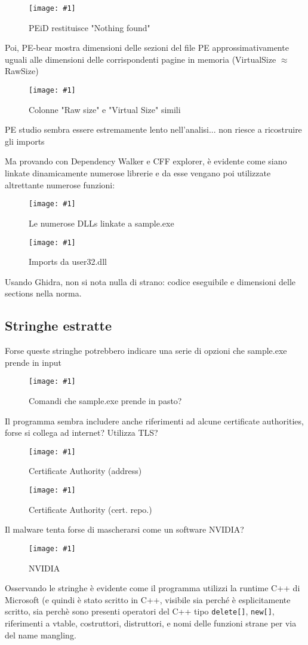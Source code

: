 \documentclass[
    a4paper, %
    11pt %
]{article}
\newcommand{\pic}[4]{\begin{figure}[H]
            \centering
            \texttt{[image: \#1]}
            \caption{#2}
            \label{fig:#1}
            \end{figure}}
\begin{document}
            \pic{nonpacker}{PEiD restituisce "Nothing found"}{14cm}{8cm}

            Poi, PE-bear mostra dimensioni delle sezioni del file PE approssimativamente uguali alle
            dimensioni delle corrispondenti pagine in memoria (VirtualSize $\approx$ RawSize)

            \pic{samesizesapprox}{Colonne "Raw size" e "Virtual Size" simili}{9cm}{5cm}

            PE studio sembra essere estremamente lento nell'analisi... non riesce a ricostruire gli imports

            Ma provando con Dependency Walker e CFF explorer, è evidente come siano linkate dinamicamente
            numerose librerie e da esse vengano poi utilizzate altrettante numerose funzioni:

            \pic{lotsofdlls}{Le numerose DLLs linkate a sample.exe}{15cm}{9cm}

            \pic{importsuser32}{Imports da user32.dll}{15cm}{7cm}
            
            Usando Ghidra, non si nota nulla di strano: codice eseguibile e dimensioni
            delle sections nella norma.

        \subsection{Stringhe estratte}
            Forse queste stringhe potrebbero indicare una serie di opzioni che sample.exe prende in input
            \pic{str_cmdline}{Comandi che sample.exe prende in pasto?}{6cm}{3cm}

            Il programma sembra includere anche riferimenti ad alcune certificate authorities, forse si collega ad
            internet? Utilizza TLS?
            \pic{str_ca}{Certificate Authority (address)}{10cm}{3cm}
            \pic{str_ca1}{Certificate Authority (cert. repo.)}{11cm}{2cm}

            Il malware tenta forse di mascherarsi come un software NVIDIA?
            \pic{str_nvidia}{NVIDIA}{10cm}{5cm}

            Osservando le stringhe è evidente come il programma utilizzi la runtime C++ di Microsoft
            (e quindi è stato scritto in C++, visibile sia perché è esplicitamente scritto, sia perchè sono
            presenti operatori del C++ tipo \texttt{delete[]}, \texttt{new[]}, riferimenti a vtable, costruttori, distruttori,
            e nomi delle funzioni strane per via del name mangling.
\end{document}

